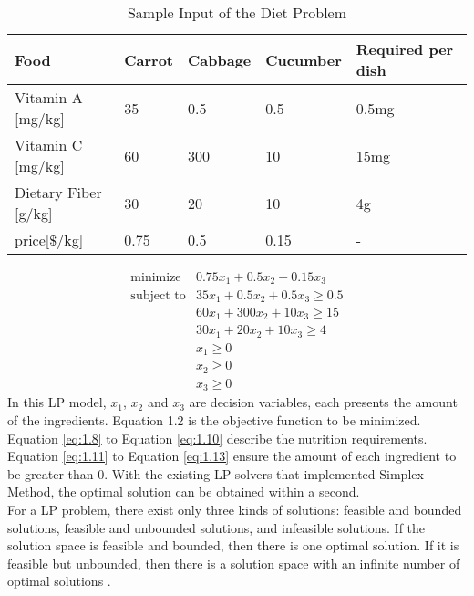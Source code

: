 \begin{table} \label{tab:1.1}
\begin{center}
\begin{tabular}{| l | l  l  l | l |}
\hline
Food & Carrot & Cabbage & Cucumber & Required per dish \\ \hline
Vitamin A [mg/kg] & 35 & 0.5 & 0.5 & 0.5mg \\ 
Vitamin C [mg/kg] & 60 & 300 & 10 & 15mg \\ 
Dietary Fiber [g/kg] & 30 & 20 & 10 & 4g \\ \hline
price[$\$$/kg] & 0.75 & 0.5 & 0.15 & - \\ \hline
\end{tabular} 
\end{center}
\caption{Sample Input of the Diet Problem}
\end{table}	

\begin{eqnarray} 
\text{minimize} & 0.75x_{1} + 0.5x_{2} +  0.15x_{3}  \label{eq:1.7} \\
\text{subject to} & 35x_{1} + 0.5x_{2} + 0.5x_{3} \geq 0.5 \label{eq:1.8} \\
& 60x_{1} + 300x_{2} + 10x_{3} \geq 15 \label{eq:1.9} \\
& 30x_{1} + 20x_{2} + 10x_{3} \geq 4 \label{eq:1.10} \\
& x_{1} \geq 0  \label{eq:1.11} \\
& x_{2} \geq 0  \label{eq:1.12} \\
& x_{3} \geq 0  \label{eq:1.13}
\end{eqnarray} 
In this LP model, $x_{1}$, $x_{2}$ and $x_{3}$ are decision variables, each presents the amount of the ingredients. Equation 1.2 is the objective function to be minimized. Equation \ref{eq:1.8} to Equation \ref{eq:1.10} describe the nutrition requirements. Equation \ref{eq:1.11} to Equation \ref{eq:1.13} ensure the amount of each ingredient to be greater than 0. With the existing LP solvers that implemented Simplex Method, the optimal solution can be obtained within a second. \\

For a LP problem, there exist only three kinds of solutions: feasible and bounded solutions, feasible and unbounded solutions, and infeasible solutions. If the solution space is feasible and bounded, then there is one optimal solution. If it is feasible but unbounded, then there is a solution space with an infinite number of optimal solutions \cite{LP}. \\

